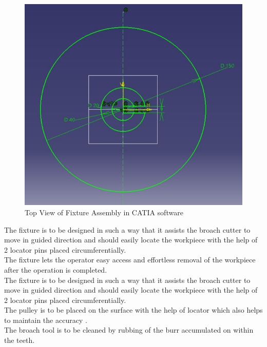 \documentclass[16pt,a4paper]{article}
\begin{document}
\begin{figure}[h]
\centering
\includegraphics[scale=0.5]{Top View of Fixture}
\caption{Top View of Fixture Assembly in CATIA software}
\label{fig:TV of Fixture}
\end{figure}

The fixture is to be designed in such a way that it assists the broach cutter to move in guided direction and should easily locate the workpiece with the help of 2 locator pins placed circumferentially.
\\The fixture lets the operator easy access and effortless removal of the workpiece after the operation is completed.
\\The fixture is to be designed in such a way that it assists the broach cutter to move in guided direction and should easily locate the workpiece with the help of 2 locator pins placed circumferentially.
\\The pulley  is to be placed on the surface with the help of locator which also helps to maintain the accuracy .
\\The broach tool is to be cleaned by rubbing of the burr accumulated on within the teeth.
\end{document}
